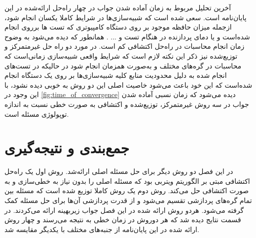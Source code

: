 	آخرین تحلیل مربوط به زمان آماده شدن جواب در چهار راه‌حل ارائه‌شده در این پایان‌نامه است. سعی شده است که شبیه‌سازی‌ها در شرایط کاملا یکسان انجام شود، ازجمله میزان حافظه موجود بر روی دستگاه کامپیوتری که تست ها برروی انجام شده‌است و یا دمای پردازنده در هنگام تست و ... . همانطور که دیده می‌شود به وضوح زمان انجام محاسبات در راه‌حل اکتشافی کم است. در مورد دو راه حل غیرمتمرکز و توزیع‌شده نیز ذکر این نکته لازم است که شرایط واقعی شبیه‌سازی زمانی‌است که محاسبات در گره‌های مختلف و به‌صورت همزمان انجام شود در حالیکه در تست‌های انجام شده به دلیل محدودیت منابع کلیه شبیه‌سازی‌ها بر روی یک دستگاه انجام شده‌است که این خود باعث می‌شود خاصیت اصلی این دو روش به خوبی دیده نشود، با این وجود در \cref{fig:time_of_convergence} دیده می‌شود که زمان نسبی آماده شدن جواب در سه روش غیرمتمرکز، توزیع‌شده و اکتشافی به صورت خطی نسبت به اندازه توپولوژی مسئله است.
	
	\section{جمع‌بندی و نتیجه‌گیری}
	در این فصل دو روش دیگر برای حل مسئله اصلی ارائه‌شد. روش اول یک راه‌حل اکتشافی مبتی بر الگوریتم ویتربی بود که مسئله اصلی را بدون نیاز به خطی‌سازی و به صورت اکتشافی حل می‌کند. 
	روش دوم یک روش کاملا توزیع شده است که مسئله بین تمام گره‌های پردازشی تقسیم می‌شود و از قدرت پردازشی آن‌ها برای حل مسئله کمک گرفته می‌شود.
	هردو روش ارائه شده در این فصل جواب زیر‌بهینه ارائه می‌کردند. 
	در قسمت نتایج دیده شد که هر دوروش در زمان خطی به نتیجه می‌رسند و چهار روش ارائه شده در این پایان‌نامه از جنبه‌های مختلف با یکدیگر مقایسه شد. 

